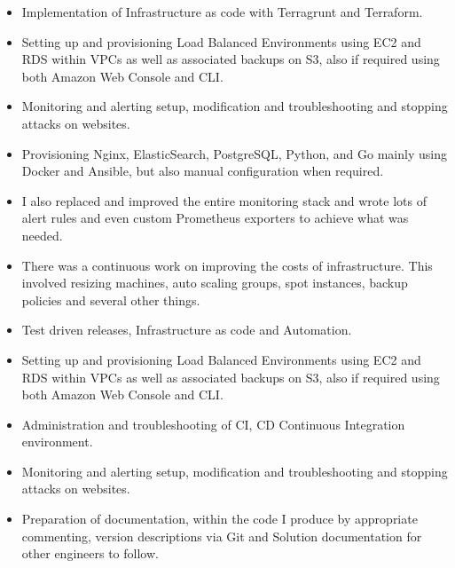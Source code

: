 \divider

\begin{itemize}
    \item Implementation of Infrastructure as code with Terragrunt and Terraform.
    \item Setting up and provisioning Load Balanced Environments using EC2 and RDS within VPCs as well as associated backups on S3, also if required using both Amazon Web Console and CLI.
    \item Monitoring and alerting setup, modification and troubleshooting and stopping attacks on websites.
    \item Provisioning Nginx, ElasticSearch, PostgreSQL, Python, and Go mainly using Docker and Ansible, but also manual configuration when required.
\end{itemize}

\divider

\begin{itemize}
    \item I also replaced and improved the entire monitoring stack and wrote lots of alert rules and even custom Prometheus exporters to achieve what was needed.
    \item There was a continuous work on improving the costs of infrastructure. This involved resizing machines, auto scaling groups, spot instances, backup policies and several other things.
    \item Test driven releases, Infrastructure as code and Automation.
    \item Setting up and provisioning Load Balanced Environments using EC2 and RDS within VPCs as well as associated backups on S3, also if required using both Amazon Web Console and CLI.
    \item Administration and troubleshooting of CI, CD Continuous Integration environment.
    \item Monitoring and alerting setup, modification and troubleshooting and stopping attacks on websites.
    \item Preparation of documentation, within the code I produce by appropriate commenting, version descriptions via Git and Solution documentation for other engineers to follow.
\end{itemize}

\divider

